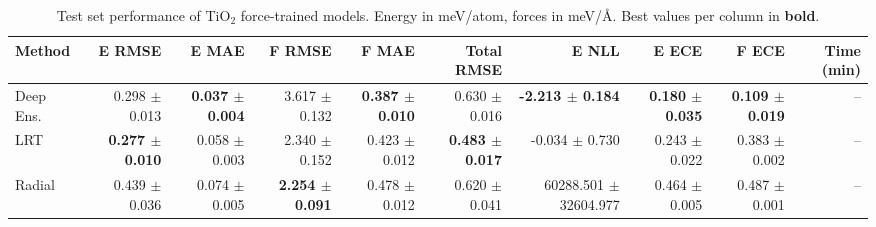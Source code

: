 \begin{table}
\centering
\caption{Test set performance of TiO$_2$ force-trained models. Energy in meV/atom, forces in meV/\AA{}. Best values per column in \textbf{bold}.}
\label{tab:tio2_results}
\begin{tabular}{lrrrrrrrrr}
\toprule
Method & E RMSE & E MAE & F RMSE & F MAE & Total RMSE & E NLL & E ECE & F ECE & Time (min) \\
\midrule
Deep Ens. & 0.298 $\pm$ 0.013 & \textbf{0.037 $\pm$ 0.004} & 3.617 $\pm$ 0.132 & \textbf{0.387 $\pm$ 0.010} & 0.630 $\pm$ 0.016 & \textbf{-2.213 $\pm$ 0.184} & \textbf{0.180 $\pm$ 0.035} & \textbf{0.109 $\pm$ 0.019} & -- \\
LRT & \textbf{0.277 $\pm$ 0.010} & 0.058 $\pm$ 0.003 & 2.340 $\pm$ 0.152 & 0.423 $\pm$ 0.012 & \textbf{0.483 $\pm$ 0.017} & -0.034 $\pm$ 0.730 & 0.243 $\pm$ 0.022 & 0.383 $\pm$ 0.002 & -- \\
Radial & 0.439 $\pm$ 0.036 & 0.074 $\pm$ 0.005 & \textbf{2.254 $\pm$ 0.091} & 0.478 $\pm$ 0.012 & 0.620 $\pm$ 0.041 & 60288.501 $\pm$ 32604.977 & 0.464 $\pm$ 0.005 & 0.487 $\pm$ 0.001 & -- \\
\bottomrule
\end{tabular}
\end{table}